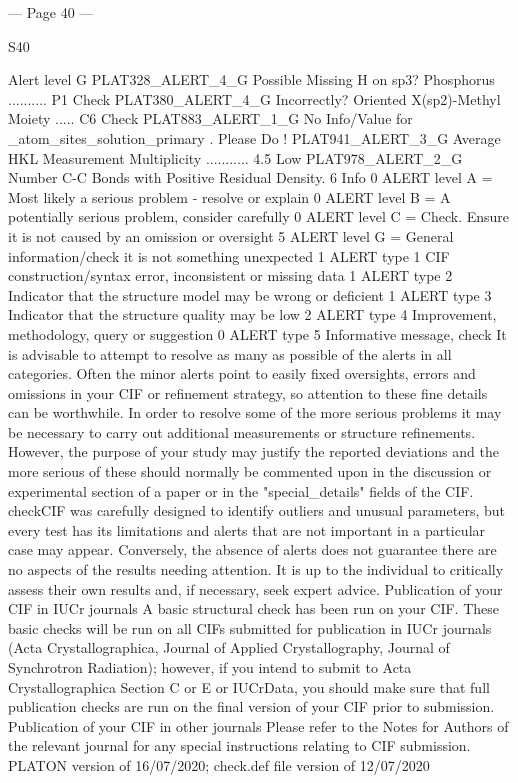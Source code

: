 --- Page 40 ---
 
 
S40 
 
 
 
 Alert level G
PLAT328_ALERT_4_G Possible Missing H on sp3? Phosphorus ..........         P1 Check 
PLAT380_ALERT_4_G Incorrectly? Oriented X(sp2)-Methyl Moiety .....         C6 Check 
PLAT883_ALERT_1_G No Info/Value for _atom_sites_solution_primary .     Please Do !  
PLAT941_ALERT_3_G Average HKL Measurement Multiplicity ...........        4.5 Low   
PLAT978_ALERT_2_G Number C-C Bonds with Positive Residual Density.          6 Info  
   0 ALERT level A = Most likely a serious problem - resolve or explain
   0 ALERT level B = A potentially serious problem, consider carefully
   0 ALERT level C = Check. Ensure it is not caused by an omission or oversight
   5 ALERT level G = General information/check it is not something unexpected
   1 ALERT type 1 CIF construction/syntax error, inconsistent or missing data
   1 ALERT type 2 Indicator that the structure model may be wrong or deficient
   1 ALERT type 3 Indicator that the structure quality may be low
   2 ALERT type 4 Improvement, methodology, query or suggestion
   0 ALERT type 5 Informative message, check
It is advisable to attempt to resolve as many as possible of the alerts in all categories. Often the
minor alerts point to easily fixed oversights, errors and omissions in your CIF or refinement
strategy, so attention to these fine details can be worthwhile. In order to resolve some of the more
serious problems it may be necessary to carry out additional measurements or structure
refinements. However, the purpose of your study may justify the reported deviations and the more
serious of these should normally be commented upon in the discussion or experimental section of a
paper or in the "special_details" fields of the CIF. checkCIF was carefully designed to identify
outliers and unusual parameters, but every test has its limitations and alerts that are not important
in a particular case may appear. Conversely, the absence of alerts does not guarantee there are no
aspects of the results needing attention. It is up to the individual to critically assess their own
results and, if necessary, seek expert advice.
Publication of your CIF in IUCr journals 
A basic structural check has been run on your CIF. These basic checks will be run on all CIFs
submitted for publication in IUCr journals (Acta Crystallographica, Journal of Applied 
Crystallography, Journal of Synchrotron Radiation); however, if you intend to submit to Acta
Crystallographica Section C or E or IUCrData, you should make sure that full publication checks
are run on the final version of your CIF prior to submission.
Publication of your CIF in other journals 
Please refer to the Notes for Authors of the relevant journal for any special instructions relating to
CIF submission.
PLATON version of 16/07/2020; check.def file version of 12/07/2020 


